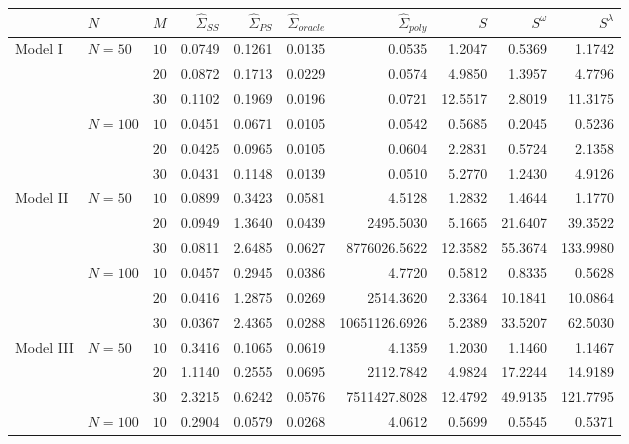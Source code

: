 \begin{table}[ht]
\centering
\begin{tabular}{l|lrrrrrrrr}
 & $N$ & $M$ &$\hat{\Sigma}_{SS}$& $\hat{\Sigma}_{PS}$ &$\hat{\Sigma}_{oracle}$& $\hat{\Sigma}_{poly}$ & $S$ &$S^\omega$& $S^\lambda$ \\ 
  \hline
Model I & $N = 50$ & $10$ & 0.0749 & 0.1261 & 0.0135 & 0.0535 & 1.2047 & 0.5369 & 1.1742 \\ 
    &   & $20$ & 0.0872 & 0.1713 & 0.0229 & 0.0574 & 4.9850 & 1.3957 & 4.7796 \\ 
    &   & $30$ & 0.1102 & 0.1969 & 0.0196 & 0.0721 & 12.5517 & 2.8019 & 11.3175 \\ 
            \hdashline
    & $N = 100$ & $10$ & 0.0451 & 0.0671 & 0.0105 & 0.0542 & 0.5685 & 0.2045 & 0.5236 \\ 
    &   & $20$ & 0.0425 & 0.0965 & 0.0105 & 0.0604 & 2.2831 & 0.5724 & 2.1358 \\ 
    &   & $30$ & 0.0431 & 0.1148 & 0.0139 & 0.0510 & 5.2770 & 1.2430 & 4.9126 \\ 
    \hdashline
       \hdashline
  Model II & $N = 50$ & $10$ & 0.0899 & 0.3423 & 0.0581 & 4.5128 & 1.2832 & 1.4644 & 1.1770 \\ 
    &   & $20$ & 0.0949 & 1.3640 & 0.0439 & 2495.5030 & 5.1665 & 21.6407 & 39.3522 \\ 
    &   & $30$ & 0.0811 & 2.6485 & 0.0627 & 8776026.5622 & 12.3582 & 55.3674 & 133.9980 \\ 
            \hdashline
    & $N = 100$ & $10$ & 0.0457 & 0.2945 & 0.0386 & 4.7720 & 0.5812 & 0.8335 & 0.5628 \\ 
    &   & $20$ & 0.0416 & 1.2875 & 0.0269 & 2514.3620 & 2.3364 & 10.1841 & 10.0864 \\ 
    &   & $30$ & 0.0367 & 2.4365 & 0.0288 & 10651126.6926 & 5.2389 & 33.5207 & 62.5030 \\ 
        \hdashline
       \hdashline
  Model III & $N = 50$ & $10$ & 0.3416 & 0.1065 & 0.0619 & 4.1359 & 1.2030 & 1.1460 & 1.1467 \\ 
    &   & $20$ & 1.1140 & 0.2555 & 0.0695 & 2112.7842 & 4.9824 & 17.2244 & 14.9189 \\ 
    &   & $30$ & 2.3215 & 0.6242 & 0.0576 & 7511427.8028 & 12.4792 & 49.9135 & 121.7795 \\ 
            \hdashline
    & $N = 100$ & $10$ & 0.2904 & 0.0579 & 0.0268 & 4.0612 & 0.5699 & 0.5545 & 0.5371 \\ 

\end{tabular}
\end{table}
